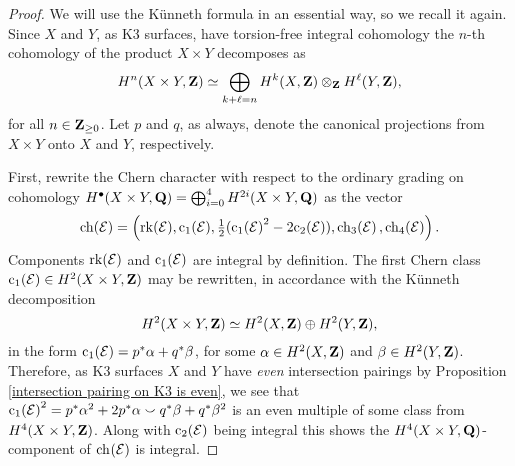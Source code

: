 \begin{proof}
    We will use the Künneth formula in an essential way, so we recall it again. Since $X$ and $Y$, as K3 surfaces, have torsion-free integral cohomology the $n$-th cohomology of the product $X \times Y$ decomposes as
    \[
        H^n(X \times Y, \mathbf Z) \simeq \bigoplus_{k+\ell = n} H^k(X, \mathbf Z) \otimes_\mathbf Z H^\ell(Y, \mathbf Z),
    \] 
    for all $n \in \mathbf Z_{\geq 0}$. Let $p$ and $q$, as always, denote the canonical projections from $X \times Y$ onto $X$ and $Y$, respectively.
    
    First, rewrite the Chern character with respect to the ordinary grading on cohomology $H^\bullet(X \times Y, \mathbf Q) = \bigoplus_{i=0}^4 H^{2i}(X \times Y, \mathbf Q)$ as the vector
    \[
        \ch{\E} = \left(\rk{\E}, \cclass[1](\E), \tfrac{1}{2}(\cclass[1]{\E}^2 - 2\cclass[2]{\E}), \ch[3]{\E}, \ch[4]{\E} \right).
    \]
    Components $\operatorname{rk}(\mathcal E)$ and $\cclass[1]{\E}$ are integral by definition. The first Chern class $\cclass[1]{\E} \in H^2(X\times Y, \Z)$ may be rewritten, in accordance with the Künneth decomposition
    \[
        H^2(X\times Y, \mathbf Z) \simeq H^2(X, \mathbf Z) \oplus H^2(Y, \mathbf Z),
    \]
    in the form $\cclass[1]{\E} = p^*\alpha + q^*\beta$, for some $\alpha \in H^2(X, \mathbf Z)$ and $\beta \in H^2(Y, \mathbf Z)$. Therefore, as K3 surfaces $X$ and $Y$ have \emph{even} intersection pairings by Proposition \ref{intersection pairing on K3 is even}, we see that $\cclass[1]{\E}^2 = p^*\alpha^2 + 2 p^*\alpha \smallsmile q^*\beta + q^*\beta^2$ is an even multiple of some class from $H^{4}(X \times Y, \mathbf Z)$. Along with $\cclass[2]{\E}$ being integral this shows the $H^4(X \times Y, \mathbf Q)$-component of $\ch[](\E)$ is integral.



\end{proof}
